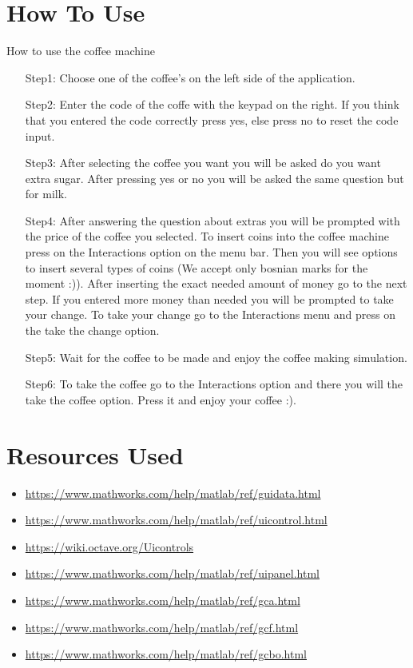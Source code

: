 \documentclass[a4paper, 10pt]{article}
\begin{document}
	\section{How To Use}
		\noindent How to use the coffee machine
		\begin{itemize}
			\item[Step1:]
				Choose one of the coffee's on the left side of the application.
			\item[Step2:]
				Enter the code of the coffe with the keypad on the right. If you think that you entered the code correctly press yes, else press no to reset the code input.
			\item[Step3:]
				After selecting the coffee you want you will be asked do you want extra sugar. After pressing yes or no you will be asked the same question but for milk.
			\item[Step4:]
				After answering the question about extras you will be prompted with the price of the coffee you selected. To insert coins into the coffee machine press on the Interactions option on the menu bar.
				Then you will see options to insert several types of coins (We accept only bosnian marks for the moment :)). After inserting the exact needed amount of money go to the next step.
				If you entered more money than needed you will be prompted to take your change. To take your change go to the Interactions menu and press on the take the change option.
			\item[Step5:]
				Wait for the coffee to be made and enjoy the coffee making simulation.
			\item[Step6:]
				To take the coffee go to the Interactions option and there you will the take the coffee option. Press it and enjoy your coffee :).
		\end{itemize}
	\section{Resources Used}
		\begin{itemize}
			\item \url{https://www.mathworks.com/help/matlab/ref/guidata.html}
			\item \url{https://www.mathworks.com/help/matlab/ref/uicontrol.html}
			\item \url{https://wiki.octave.org/Uicontrols}
			\item \url{https://www.mathworks.com/help/matlab/ref/uipanel.html}
			\item \url{https://www.mathworks.com/help/matlab/ref/gca.html}
			\item \url{https://www.mathworks.com/help/matlab/ref/gcf.html}
			\item \url{https://www.mathworks.com/help/matlab/ref/gcbo.html}
		\end{itemize}
\end{document}
